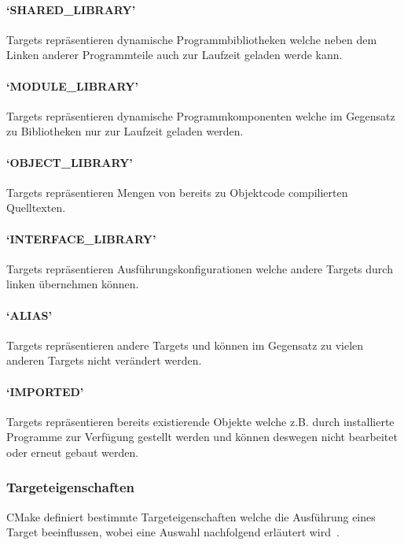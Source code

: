 \documentclass[german,proseminar,hyperref,utf8]{zihpub}
\begin{document}
    \paragraph{`SHARED\_LIBRARY'} Targets repräsentieren dynamische Programmbibliotheken welche
    neben dem Linken anderer Programmteile auch zur Laufzeit geladen werde kann.

    \paragraph{`MODULE\_LIBRARY'} Targets repräsentieren dynamische Programmkomponenten welche
    im Gegensatz zu Bibliotheken nur zur Laufzeit geladen werden.

    \paragraph{`OBJECT\_LIBRARY'} Targets repräsentieren Mengen von bereits zu Objektcode
    compilierten Quelltexten.

    \paragraph{`INTERFACE\_LIBRARY'} Targets repräsentieren Ausführungskonfigurationen welche andere
    Targets durch linken übernehmen können.

    \paragraph{`ALIAS'} Targets repräsentieren andere Targets und können im Gegensatz zu vielen
    anderen Targets nicht verändert werden.

    \paragraph{`IMPORTED'} Targets repräsentieren bereits existierende Objekte welche z.B. durch
    installierte Programme zur Verfügung gestellt werden und können deswegen nicht bearbeitet
    oder erneut gebaut werden.

    \subsubsection{Targeteigenschaften}
    CMake definiert bestimmte Targeteigenschaften welche die Ausführung eines Target beeinflussen,
    wobei eine Auswahl nachfolgend erläutert wird~.
\end{document}
